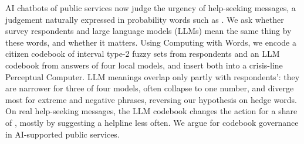 AI chatbots of public services now judge the urgency of help-seeking messages, a judgement naturally expressed in
probability words such as .
We ask whether survey respondents and large language models (LLMs) mean the same thing by these words, and whether it matters.
Using Computing with Words, we encode a citizen codebook of interval type-2 fuzzy sets from \WoneNRespondents{}
respondents and an LLM codebook from \WtwoAnswersTotalNRows{} answers of four local models, and insert both into a
crisis-line Perceptual Computer.
LLM meanings overlap only partly with respondents': they are narrower for three of four models, often collapse to
one number, and diverge most for extreme and negative phrases, reversing our hypothesis on hedge words.
On \WthreeNItems{} real help-seeking messages, the LLM codebook changes the action for a share of
\WthreeActionFlipRateLlmVsCitizenFull{}, mostly by suggesting a helpline less often.
We argue for codebook governance in AI-supported public services.
